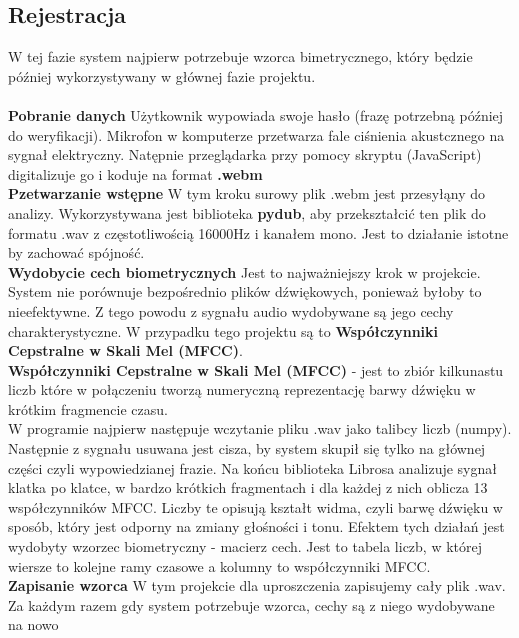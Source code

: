 \subsection{Rejestracja}
W tej fazie system najpierw potrzebuje wzorca bimetrycznego, który będzie później wykorzystywany w głównej fazie projektu.
\\
\\
\textbf{Pobranie danych}\newline
Użytkownik wypowiada swoje hasło (frazę potrzebną później do weryfikacji). Mikrofon w komputerze przetwarza fale ciśnienia akustcznego na sygnał elektryczny. Natępnie przeglądarka przy pomocy skryptu (JavaScript) digitalizuje go i koduje na format \textbf{.webm}
\newline
\\
\textbf{Pzetwarzanie wstępne}\newline
W tym kroku surowy plik .webm jest przesyłąny do analizy. Wykorzystywana jest biblioteka \textbf{pydub}, aby przekształcić ten plik do formatu .wav z częstotliwością 16000Hz i kanałem mono. Jest to działanie istotne by zachować spójność.
\newline
\\
\textbf{Wydobycie cech biometrycznych}\newline
Jest to najważniejszy krok w projekcie. System nie porównuje bezpośrednio plików dźwiękowych, ponieważ byłoby to nieefektywne. Z tego powodu z sygnału audio wydobywane są jego cechy charakterystyczne. W przypadku tego projektu są to \textbf{Współczynniki Cepstralne w Skali Mel (MFCC)}.
\newline
\\
\textbf{Współczynniki Cepstralne w Skali Mel (MFCC)} - jest to zbiór kilkunastu liczb które w połączeniu tworzą numeryczną reprezentację barwy dźwięku w krótkim fragmencie czasu.
\newline
\\
W programie najpierw następuje wczytanie pliku .wav jako talibcy liczb (numpy). Następnie z sygnału usuwana jest cisza, by system skupił się tylko na głównej części czyli wypowiedzianej frazie. Na końcu biblioteka Librosa analizuje sygnał klatka po klatce, w bardzo krótkich fragmentach i dla każdej z nich oblicza 13 współczynników MFCC. Liczby te opisują kształt widma, czyli barwę dźwięku w sposób, który jest odporny na zmiany głośności i tonu.
\newline
Efektem tych działań jest wydobyty wzorzec biometryczny - macierz cech. Jest to tabela liczb, w której wiersze to kolejne ramy czasowe a kolumny to współczynniki MFCC.
\newline
\\
\textbf{Zapisanie wzorca}\newline
W tym projekcie dla uproszczenia zapisujemy cały plik .wav. Za każdym razem gdy system potrzebuje wzorca, cechy są z niego wydobywane na nowo

